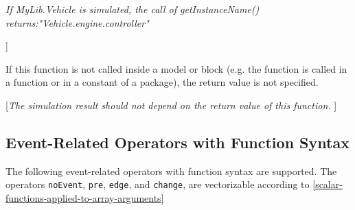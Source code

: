 \emph{If MyLib.Vehicle is simulated, the call of getInstanceName()
returns:"Vehicle.engine.controller"}

{]}

If this function is not called inside a model or block (e.g. the
function is called in a function or in a constant of a package), the
return value is not specified.

{[}\emph{The simulation result should not depend on the return value of
this function.} {]}

\subsection{Event-Related Operators with Function Syntax}

The following event-related operators with function syntax are
supported. The operators \lstinline[basicstyle=\ttfamily]!noEvent!, \lstinline[basicstyle=\ttfamily]!pre!, \lstinline[basicstyle=\ttfamily]!edge!, and \lstinline[basicstyle=\ttfamily]!change!, are
vectorizable according to \autoref{scalar-functions-applied-to-array-arguments}

